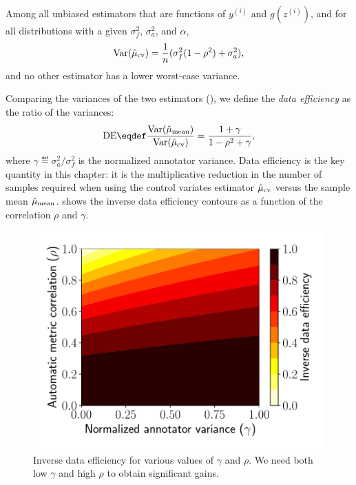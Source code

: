 \begin{theorem}
\label{thm:price:main}
Among all unbiased
  estimators that are functions of $y^{(i)}$ and $g(z^{(i)})$, and for all distributions with a given $\sigma^2_f$, $\sigma^2_a$, and $\alpha$,
\begin{align}
  \label{eqn:varcontrol}
  \operatorname{Var}(\hat \mu_\text{cv}) = \frac{1}{n} (\sigma^2_f (1 - \rho^2) + \sigma^2_a),
\end{align}
and no other estimator has a lower worst-case variance.
\end{theorem}

Comparing the variances of the two estimators (),
we define the \emph{data efficiency} as the ratio of the variances:
\begin{align}
\DE \eqdef \frac{\Var(\musimple)}{\Var(\mucontrol)} = \frac{1 + \gamma}{1-\rho^2 + \gamma},
\end{align}
where $\gamma \eqdef \sigma^2_a / \sigma^2_f$ is the normalized annotator variance.
Data efficiency is the key quantity in this chapter:
  it is the multiplicative reduction in the number of samples required
  when using the control variates estimator $\hat \mu_\text{cv}$ versus the sample mean $\hat \mu_\text{mean}$.
 shows the inverse data efficiency contours as a function of the correlation $\rho$
and $\gamma$.

\begin{figure}
\centering
  \includegraphics[width=0.8\columnwidth]{figures/savings}
  \caption[Inverse data efficiency with the control variates estimator]  {\label{fig:price:savings} Inverse data efficiency for various values of
  $\gamma$ and $\rho$.  We need both low $\gamma$ and high $\rho$ to obtain
  significant gains.
  }
\end{figure}

